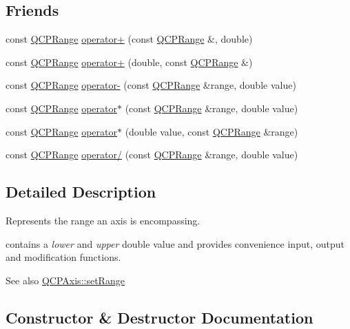 \subsection*{Friends}
\begin{DoxyCompactItemize}
\item 
const \hyperlink{class_q_c_p_range}{Q\+C\+P\+Range} \hyperlink{class_q_c_p_range_af53ea6fb823a4a5897162b865841de04}{operator+} (const \hyperlink{class_q_c_p_range}{Q\+C\+P\+Range} \&, double)
\item 
const \hyperlink{class_q_c_p_range}{Q\+C\+P\+Range} \hyperlink{class_q_c_p_range_a9fb2e9941d32001482df670c0d704977}{operator+} (double, const \hyperlink{class_q_c_p_range}{Q\+C\+P\+Range} \&)
\item 
const \hyperlink{class_q_c_p_range}{Q\+C\+P\+Range} \hyperlink{class_q_c_p_range_a797f82830b516646da8873f82e39e356}{operator-\/} (const \hyperlink{class_q_c_p_range}{Q\+C\+P\+Range} \&range, double value)
\item 
const \hyperlink{class_q_c_p_range}{Q\+C\+P\+Range} \hyperlink{class_q_c_p_range_a558b1248ff6a9e41fd5b2630555a8acc}{operator$\ast$} (const \hyperlink{class_q_c_p_range}{Q\+C\+P\+Range} \&range, double value)
\item 
const \hyperlink{class_q_c_p_range}{Q\+C\+P\+Range} \hyperlink{class_q_c_p_range_a5cb2332f6957021f47cc768089f4f090}{operator$\ast$} (double value, const \hyperlink{class_q_c_p_range}{Q\+C\+P\+Range} \&range)
\item 
const \hyperlink{class_q_c_p_range}{Q\+C\+P\+Range} \hyperlink{class_q_c_p_range_a4b366a3a21974c88e09b0d39d4a24a4b}{operator/} (const \hyperlink{class_q_c_p_range}{Q\+C\+P\+Range} \&range, double value)
\end{DoxyCompactItemize}


\subsection{Detailed Description}
Represents the range an axis is encompassing. 

contains a {\itshape lower} and {\itshape upper} double value and provides convenience input, output and modification functions.

\begin{DoxySeeAlso}{See also}
\hyperlink{class_q_c_p_axis_aebdfea5d44c3a0ad2b4700cd4d25b641}{Q\+C\+P\+Axis\+::set\+Range} 
\end{DoxySeeAlso}


\subsection{Constructor \& Destructor Documentation}
\hypertarget{class_q_c_p_range_aca158d7e69702cee5d77d10a269b01e2}{}\label{class_q_c_p_range_aca158d7e69702cee5d77d10a269b01e2} 

